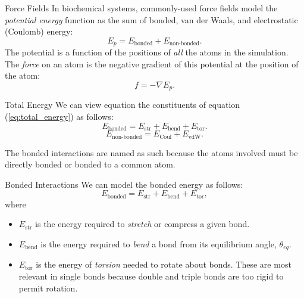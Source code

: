 \documentclass[aspectratio=169]{beamer}
\begin{document}
\begin{frame}[fragile]{Force Fields}
In biochemical systems, commonly-used force fields model the \emph{potential energy} function as the sum of bonded, van der Waals, and electrostatic (Coulomb) energy:
%
\begin{equation}
	\label{eq:total_energy}
	E_p = E_{\text{bonded}} + E_{\text{non-bonded}}.
\end{equation}
%
The potential is a function of the positions of \emph{all} the atoms in the simulation. The \emph{force} on an atom is the negative gradient of this potential at the position of the atom:
%
\begin{equation}
	f = -\nabla E_p.
\end{equation}
%

\end{frame}

\begin{frame}[fragile]{Total Energy}
We can view equation the constituents of equation (\ref{eq:total_energy}) as follows:
%
\begin{equation}
	E_{\text{bonded}} = E_{\text{str}} + E_{\text{bend}} + E_{\text{tor}}.
\end{equation}
%
%
\begin{equation}
	E_{\text{non-bonded}} = E_{\text{Coul}} + E_{\text{vdW}}.
\end{equation}
%

The bonded interactions are named as such because the atoms involved must be directly bonded or bonded to a common atom.

\end{frame}

\begin{frame}[fragile]{Bonded Interactions}
We can model the bonded energy as follows:
%
\begin{equation}
	E_{\text{bonded}} = E_{\text{str}} + E_{\text{bend}} + E_{\text{tor}},
\end{equation}
%
where
%
\begin{itemize}
	\item $E_{\text{str}}$ is the energy required to \emph{stretch} or compress a given bond.
	\item $E_{\text{bend}}$ is the energy required to \emph{bend} a bond from its equilibrium angle, $\theta_{eq}$.
	\item $E_{\text{tor}}$ is the energy of \emph{torsion} needed to rotate about bonds. These are most relevant in single bonds because double and triple bonds are too rigid to permit rotation.
\end{itemize}
%

\end{frame}
\end{document}
